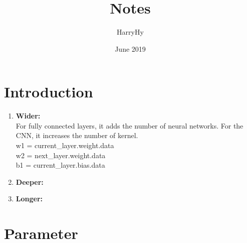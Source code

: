 \documentclass{article}
\title{Notes}
\author{HarryHy }
\date{June 2019}
\begin{document}
\maketitle

\section{Introduction}
\begin{enumerate}
\item{\textbf{Wider:}}\\
For fully connected layers, it adds the number of neural networks. For the CNN, it increases the number of kernel.\\
w1 = current\_layer.weight.data\\
w2 = next\_layer.weight.data\\
b1 = current\_layer.bias.data\\
\item{\textbf{Deeper:}}\\
\item{\textbf{Longer:}}\\
\end{enumerate}
\section{Parameter}
\end{document}
